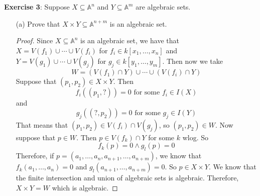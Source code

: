 \documentclass{article}
\begin{document}
\textbf{Exercise 3}: Suppose $X \subseteq \mathbb{A}^{n}$ and $Y \subseteq \mathbb{A}^{m}$ are algebraic sets.
    \begin{itemize}
        \item [(a)] Prove that $X \times Y \subseteq \mathbb{A}^{n + m}$ is an algebraic set.
            \begin{proof}
                Since $X \subseteq \mathbb{A}^{n}$ is an algebraic set, we have that $X = V(f_{1}) \cup \cdots \cup V(f_{i})$ for $f_{i} \in k[x_{1}, \ldots , x_{n}]$ and $Y = V(g_{1}) \cup  \cdots \cup V(g_{j})$ for $g_{j} \in k[y_{1}, \ldots , y_{m}]$. Then now we take
                    \begin{equation*}
                        W = (V(f_{1}) \cap Y) \cup \cdots \cup (V(f_{i}) \cap Y)
                    \end{equation*}
                Suppose that $(p_{1}, p_{2}) \in X \times Y$. Then 
                    \begin{equation*}
                        f_{i}((p_{1}, ?)) = 0 \text{ for some $f_{i} \in I(X)$}
                    \end{equation*}
                and 
                    \begin{equation*}
                        g_{j}((?, p_{2})) = 0 \text{ for some $g_{j} \in I(Y)$}
                    \end{equation*}
                That means that $(p_{1}, p_{2}) \in V(f_{i}) \cap V(g_{j})$, so $(p_{1}, p_{2}) \in W$. Now suppose that $p \in W$. Then $p \in V(f_{k}) \cap Y$ for some $k$ wlog. So
                    \begin{equation*}
                        f_{k}(p) = 0 \land g_{l}(p) = 0
                    \end{equation*}
                Therefore, if $p = (a_{1}, \ldots , a_{n}, a_{n + 1}, \ldots , a_{n + m})$, we know that $f_{k}(a_{1}, \ldots , a_{n}) = 0$ and $g_l(a_{n + 1}, \ldots , a_{n + m}) = 0$. So $p \in X \times Y$. We know that the finite intersection and union of algebraic sets is algebraic. Therefore, $X \times Y = W$ which is algebraic.
            \end{proof}


\end{itemize}
\end{document}
